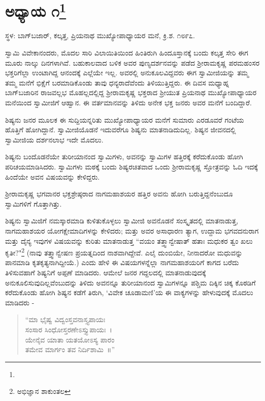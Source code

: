 
\chapter[ಅಧ್ಯಾಯ ೧]{ಅಧ್ಯಾಯ ೧\protect\footnote{}}

\centerline{{\fontsize{11}{13}\selectfont ಸ್ಥಳ: ಬಾಗ್‌ಬಜಾರ್, ಕಲ್ಕತ್ತ, ಪ್ರಿಯನಾಥ ಮುಖ್ಯೋಪಾಧ್ಯಾಯರ ಮನೆ, ಕ್ರಿ.ಶ. ೧೮೯೭.}}

ಸ್ವಾಮಿ ವಿವೇಕಾನಂದರು, ಮೊದಲ ಸಾರಿ ವಿಲಾಯಿತಿಯಿಂದ ಹಿಂತಿರುಗಿ ಹಿಂದೂಸ್ತಾನಕ್ಕೆ ಬಂದು ಕಲ್ಕತ್ತ ಸೇರಿ ಈಗ ಮೂರು ನಾಲ್ಕು ದಿನಗಳಾಗಿವೆ. ಬಹುಕಾಲವಾದ ಬಳಿಕ ಅವರ ಪುಣ್ಯದರ್ಶನವನ್ನು ಪಡೆದ ಶ‍್ರೀರಾಮಕೃಷ್ಣ ಪರಮಹಂಸರ ಭಕ್ತರಿಗೆಲ್ಲಾ ಉಂಟಾಗಿದ್ದ ಆನಂದಕ್ಕೆ ಎಲ್ಲೆಯೇ ಇಲ್ಲ. ಅವರಲ್ಲಿ ಅನುಕೂಲವಿದ್ದವರು ಈಗ ಸ್ವಾಮೀಜಿಯನ್ನು ತಮ್ಮ ತಮ್ಮ ಮನೆಗೆ ಭಿಕ್ಷೆಗೆ ಬರಮಾಡಿಕೊಂಡು ತಾವು ಧನ್ಯರಾದೆವೆಂದು ತಿಳಿಯುತ್ತಿದ್ದರು. ಈ ದಿವಸ ಮಧ್ಯಾಹ್ನ ಬಾಗ್‌ಬಜಾರಿನ ರಾಜವಲ್ಲಭ ಮೊಹಲ್ಲದಲ್ಲಿದ್ದ ಶ‍್ರೀರಾಮಕೃಷ್ಣ ಭಕ್ತರಾದ ಶ‍್ರೀಯುತ ಪ್ರಿಯನಾಥ ಮುಖ್ಯೋಪಾಧ್ಯಾಯರ ಮನೆಯಿಂದ ಸ್ವಾಮೀಜಿಗೆ ಆಹ್ವಾನ. ಈ ವರ್ತಮಾನವನ್ನು ತಿಳಿದು ಅನೇಕ ಭಕ್ತ ಜನರು ಅವರ ಮನೆಗೆ ಬಂದಿದ್ದಾರೆ.

ಶಿಷ್ಯನು ಜನರ ಮೂಲಕ ಈ ಸುದ್ದಿಯನ್ನರಿತು ಮುಖ್ಯೋಪಾಧ್ಯಾಯರ ಮನೆಗೆ ಸುಮಾರು ಎರಡೂವರೆ ಗಂಟೆಯ ಹೊತ್ತಿಗೆ ಹೋಗಿದ್ದಾನೆ. ಸ್ವಾಮೀಜಿಯೊಡನೆ ಇದುವರೆಗೂ ಶಿಷ್ಯನು ಮಾತನಾಡಿದುದಿಲ್ಲ. ಶಿಷ್ಯನ ಜೀವನದಲ್ಲಿ ಸ್ವಾಮೀಜಿಯ ದರ್ಶನಲಾಭ ಇದೇ ಮೊದಲು.

ಶಿಷ್ಯನು ಬಂದೊಡನೆಯೇ ತುರೀಯಾನಂದ ಸ್ವಾಮಿಗಳು, ಅವನನ್ನು ಸ್ವಾಮಿಗಳ ಹತ್ತಿರಕ್ಕೆ ಕರೆದುಕೊಂಡು ಹೋಗಿ ಪರಿಚಯಮಾಡಿಸಿದರು. ಸ್ವಾಮಿಗಳು ಮಠಕ್ಕೆ ಬಂದು ಶಿಷ್ಯರಚಿತವಾದ ಒಂದು ಶ‍್ರೀರಾಮಕೃಷ್ಣ ಸ್ತೋತ್ರವನ್ನು ಓದಿ ಇದಕ್ಕೆ ಹಿಂದೆಯೇ ಅವನ ವಿಷಯವನ್ನು ಕೇಳಿದ್ದರು.

ಶ‍್ರೀರಾಮಕೃಷ್ಣ ಭಗವಾನರ ಭಕ್ತಶ್ರೇಷ್ಠರಾದ ನಾಗಮಹಾಶಯರ ಹತ್ತಿರ ಅವನು ಹೋಗಿ ಬರುತ್ತಿದ್ದನೆಂಬುದೂ ಸ್ವಾಮಿಗಳಿಗೆ ಗೊತ್ತಾಗಿತ್ತು.

ಶಿಷ್ಯನು ಸ್ವಾಮಿಜಿಗೆ ನಮಸ್ಕಾರಮಾಡಿ ಕುಳಿತುಕೊಳ್ಳಲು ಸ್ವಾಮೀಜಿ ಅವನೊಡನೆ ಸಂಸ್ಕೃತದಲ್ಲಿ ಮಾತನಾಡುತ್ತ, ನಾಗಮಹಾಶಯರ ಯೋಗಕ್ಷೇಮಾದಿಗಳನ್ನು ಕೇಳಿದರು; ಮತ್ತು ಅವರ ಅಸಾಧಾರಣ ತ್ಯಾಗ, ಉದ್ದಾಮ ಭಗವದನುರಾಗ ಮತ್ತು ದೈನ್ಯ ಇವುಗಳ ವಿಷಯವನ್ನು ಕುರಿತು ಮಾತನಾಡುತ್ತ “ವಯಂ ತತ್ತ್ವಾನ್ವೇಷಾತ್ ಹತಾಃ ಮಧುಕರ ತ್ವಂ ಖಲು ಕೃತೀ?"\footnote{ಅಭಿಜ್ಞಾನ ಶಾಕುಂತಲ} (ನಾವು ತತ್ತ್ವಾನ್ವೇಷಣ ಪ್ರಯತ್ನದಿಂದ ನಾಶವಾಗಿದ್ದೇವೆ. ಎಲೈ ದುಂಬಿಯೇ, ನೀನಾದರೋ ಮಧುವನ್ನು ಪಾನಮಾಡಿ ಕೃತಕೃತ್ಯನಾಗಿದ್ದೀಯೆ.) ಎಂದು ಹೇಳಿ ಈ ವಿಷಯಗಳನ್ನೆಲ್ಲಾ ನಾಗಮಹಾಶಯರಿಗೆ ಕಾಗದ ಬರೆದು ತಿಳಿಸುವಹಾಗೆ ಶಿಷ್ಯನಿಗೆ ಅಪ್ಪಣೆ ಮಾಡಿದರು. ಆಮೇಲೆ ಜನರ ಗದ್ದಲದಲ್ಲಿ ಮಾತನಾಡುವುದಕ್ಕೆ ಅನುಕೂಲಿಸುವುದಿಲ್ಲವೆಂಬುದನ್ನು ತಿಳಿದು ಅವನನ್ನೂ ತುರೀಯಾನಂದ ಸ್ವಾಮಿಗಳನ್ನೂ ಪಶ್ಚಿಮ ದಿಕ್ಕಿನ ಚಿಕ್ಕ ಕೊಠಡಿಗೆ ಕರೆದುಕೊಂಡು ಹೋಗಿ ಶಿಷ್ಯನ ಕಡೆಗೆ ತಿರುಗಿ, ‘ವಿವೇಕ ಚೂಡಾಮಣಿ’ಯ ಈ ವಾಕ್ಯಗಳನ್ನು ಹೇಳುವುದಕ್ಕೆ ಮೊದಲು ಮಾಡಿದರು -

\begin{verse}
“ಮಾ ಭೈಷ್ವ ವಿದ್ವಂಸ್ತವನಾಸ್ತ್ಯಪಾಯಃ\\ಸಂಸಾರ ಸಿಂಧೋಸ್ತರಣೇಽಸ್ತ್ಯುಪಾಯಃ~।\\ಯೇನೈವ ಯಾತಾ ಯತಯೋಽಸ್ಯ ಪಾರಂ\\ತಮೇವ ಮಾರ್ಗಂ ತವ ನಿರ್ದಿಶಾಮಿ~॥”
\end{verse}


